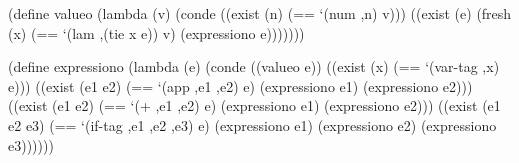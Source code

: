 




\schemedisplayspace
\begin{schemedisplay}
(define valueo
  (lambda (v)
    (conde
      ((exist (n)
         (== `(num ,n) v)))
      ((exist (e)
         (fresh (x)
           (== `(lam ,(tie x e)) v)
           (expressiono e)))))))
\end{schemedisplay}

\schemedisplayspace
\begin{schemedisplay}
(define expressiono
  (lambda (e)
    (conde
      ((valueo e))
      ((exist (x)
         (== `(var-tag ,x) e)))
      ((exist (e1 e2)
         (== `(app ,e1 ,e2) e)
         (expressiono e1)
         (expressiono e2)))
      ((exist (e1 e2)
         (== `(+ ,e1 ,e2) e)
         (expressiono e1)
         (expressiono e2)))
      ((exist (e1 e2 e3)
         (== `(if-tag ,e1 ,e2 ,e3) e)
         (expressiono e1)
         (expressiono e2)
         (expressiono e3))))))
\end{schemedisplay}


